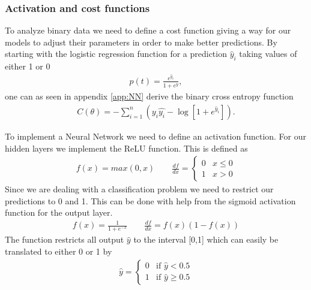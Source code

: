 \documentclass[11pt]{article}
\begin{document}
\subsubsection*{Activation and cost functions}
To analyze binary data we need to define a cost function giving a way for our models to adjust their parameters in order to make better predictions. By starting with the logistic regression function for a prediction $\hat{y}_i$ taking values of either 1 or 0
\begin{align*}
    p(t) = \frac{e^{\hat{y}_i}}{1 + e^{\hat{y}}},
\end{align*}
one can as seen in appendix \ref{app:NN} derive the binary cross entropy function
\begin{align*}
    C(\theta) = - \sum_{i=1}^n (y_i\hat{y_i} - \log[1+ e^{\hat{y}_i}]).
\end{align*}

To implement a Neural Network we need to define an activation function. For our hidden layers we implement the ReLU function. This is defined as
\begin{align*}
    f(x) = max(0, x) \quad\quad \frac{d f }{dx} = \begin{cases}
        0 & x \leq 0 \\
        1 & x > 0
    \end{cases}
\end{align*}
Since we are dealing with a classification problem we need to restrict our predictions to 0 and 1. This can be done with help from the sigmoid activation function for the output layer.
\begin{align*}
    f(x) = \frac{1 }{1 + e^{-x}} \quad\quad \frac{df }{dx} = f(x)(1-f(x))
\end{align*}
The function restricts all output $\hat{y}$ to the interval [0,1] which can easily be translated to either 0 or 1 by
\begin{align*}
    \hat{y} =
    \begin{cases}
        0 & \text{if } \hat{y} < 0.5    \\
        1 & \text{if } \hat{y} \geq 0.5
    \end{cases}
\end{align*}
\end{document}
